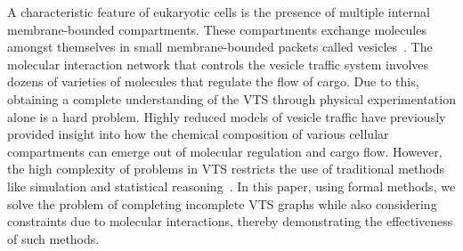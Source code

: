 \noindent A characteristic feature of eukaryotic cells is the presence of multiple internal membrane-bounded compartments. 
%
These compartments exchange molecules amo\-ngst themselves in small membrane-bounded packets called vesicles~\cite{alberts2002molecular}. 
%
The molecular interaction network that controls the vesicle traffic system involves dozens of varieties of molecules that regulate the flow of cargo. 
%
Due to this, obtaining a complete understanding of the VTS through physical experimentation alone is a hard problem.
%
Highly reduced models of vesicle traffic have previously provided insight into how the chemical composition of various cellular compartments can emerge out of molecular regulation and cargo flow. 
%
However, the high complexity of problems in VTS restricts the use of traditional methods like simulation and statistical reasoning~\cite{mani2016stacking}. 
In this paper, using formal methods, we solve the problem of completing incomplete VTS graphs while also considering constraints due to molecular interactions, thereby demonstrating the effectiveness of such methods.
%
%
~        
